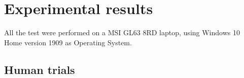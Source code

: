 \chapter{Experimental results}
All the test were performed on a MSI GL63 8RD laptop, using Windows 10 Home version 1909 as Operating System.

\section{Human trials}

